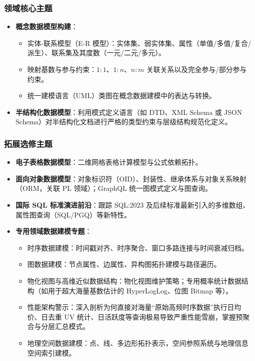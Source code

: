 \subsubsection{领域核心主题}
\begin{itemize}
    \item \textbf{概念数据模型构建}：
    \begin{itemize}
        \item 实体-联系模型（E-R 模型）：实体集、弱实体集、属性（单值/多值/复合/派生）、联系集及其度数（一元/二元/多元）。
        \item 映射基数与参与约束：$1:1$、$1:n$、$n:m$ 关联关系以及完全参与/部分参与约束。
        \item 统一建模语言（UML）类图在概念数据建模中的表达与转换。
    \end{itemize}
    \item \textbf{半结构化数据模型}：利用模式定义语言（如 DTD、XML Schema 或 JSON Schema）对半结构化文档进行严格的类型约束与层级结构规范化定义。
\end{itemize}

\subsubsection{拓展选修主题}
\begin{itemize}
    \item \textbf{电子表格数据模型}：二维网格表格计算模型与公式依赖拓扑。
    \item \textbf{面向对象数据模型}：对象标识符（OID）、封装性、继承体系与对象关系映射（ORM，关联 PL 领域）；GraphQL 统一图模式定义与图查询。
    \item \textbf{国际 SQL 标准演进前沿}：跟踪 SQL:2023 及后续标准最新引入的多维数组、属性图查询（SQL/PGQ）等新特性。
    \item \textbf{专用领域数据建模专题}：
    \begin{itemize}
        \item 时序数据建模：时间戳对齐、时序聚合、窗口多路连接与时间衰减归档。
        \item 图数据建模：节点属性、边属性、异构图拓扑建模与路径遍历。
        \item 物化视图与高维近似数据结构：物化视图维护策略；专用概率统计数据结构（如用于超大海量基数估计的 HyperLogLog、位图 Bitmap 等）。
        \item 性能架构警示：深入剖析为何直接对海量“原始高频时序数据”执行日均价、日去重 UV 统计、日活跃度等查询极易导致严重性能雪崩，掌握预聚合与分层汇总模式。
        \item 地理空间数据建模：点、线、多边形拓扑表示，空间参照系统与地理信息空间索引建模。
    \end{itemize}
\end{itemize}

